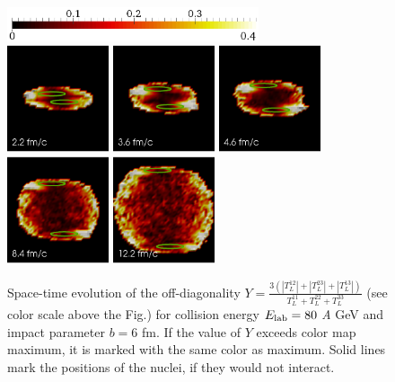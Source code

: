 \begin{figure}
  \includegraphics[height = 1cm]{plots/thermalization_urqmd/E80b6_x_paraview_color_legend.png} \\
  \includegraphics[width = 3.0cm]{plots/thermalization_urqmd/E80b6_y_paraview_t2_2fm.png}
  \includegraphics[width = 3.0cm]{plots/thermalization_urqmd/E80b6_y_paraview_t3_6fm.png}
  \includegraphics[width = 3.0cm]{plots/thermalization_urqmd/E80b6_y_paraview_t4_6fm.png}
  \includegraphics[width = 3.0cm]{plots/thermalization_urqmd/E80b6_y_paraview_t8_4fm.png}
  \includegraphics[width = 3.0cm]{plots/thermalization_urqmd/E80b6_y_paraview_t12_2fm.png}
  \caption{Space-time evolution of the off-diagonality $Y = \frac{3(|T^{12}_L| +
           |T^{23}_L| + |T^{13}_L|)}{T^{11}_L + T^{22}_L + T^{33}_L}$ (see color scale
           above the Fig.) for collision energy $E_\mathrm{lab} = 80$ \emph{A} GeV and
           impact parameter $b = 6$ fm. If the value of $Y$ exceeds color map maximum,
           it is marked with the same color as maximum. Solid lines mark the positions
           of the nuclei, if they would not interact.}
  \label{FIG:y_paraview_space_time_evolution}
\end{figure}


